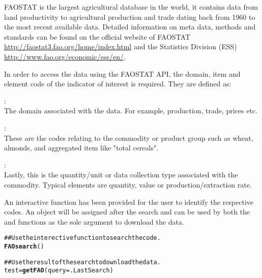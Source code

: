 \documentclass[nojss]{jss}\usepackage{graphicx, color}
\makeatletter
\newcommand{\hlfunctioncall}[1]{\textcolor[rgb]{0.501960784313725,0,0.329411764705882}{\textbf{#1}}}%
\newcommand{\hlcomment}[1]{\textcolor[rgb]{0.180392156862745,0.6,0.341176470588235}{#1}}%
\newenvironment{kframe}{%
 \def\at@end@of@kframe{}%
 \ifinner\ifhmode%
  \def\at@end@of@kframe{\end{minipage}}%
  \begin{minipage}{\columnwidth}%
 \fi\fi%
 \def\FrameCommand##1{\hskip\@totalleftmargin \hskip-\fboxsep
 \colorbox{shadecolor}{##1}\hskip-\fboxsep
     \hskip-\linewidth \hskip-\@totalleftmargin \hskip\columnwidth}%
 \MakeFramed {\advance\hsize-\width
   \@totalleftmargin\z@ \linewidth\hsize
   \@setminipage}}%
 {\par\unskip\endMakeFramed%
 \at@end@of@kframe}
\newenvironment{knitrout}{}{} %
\makeatother
\begin{document}
FAOSTAT is the largest agricultural database in the world, it contains
data from land productivity to agricultural production and trade
dating back from 1960 to the most recent available data. Detailed
information on meta data, methods and standards can be found on the
official website of FAOSTAT
\url{http://faostat3.fao.org/home/index.html} and the Statistics
Division (ESS) \url{http://www.fao.org/economic/ess/en/}.

In order to access the data using the FAOSTAT API, the domain, item
and element code of the indicator of interest is required. They are
defined as:

\begin{itemize}
  {\setlength\itemindent{48pt}\item[Domain Code]: \hfill\\ The domain
    associated with the data. For example, production, trade, prices
    etc.}  {\setlength\itemindent{30pt}\item[Item Code]: \hfill\\
    These are the codes relating to the commodity or product group
    such as wheat, almonds, and aggregated item like "total cereals".}
  {\setlength\itemindent{49pt}\item[Element Code]: \hfill\\Lastly,
    this is the quantity/unit or data collection type associated with
    the commodity. Typical elements are quantity, value or
    production/extraction rate.}
\end{itemize}

An interactive function  has been provided for the
user to identify the respective codes. An object 
will be assigned after the search and can be used by both the
 and  functions as the sole argument to
download the data.

\begin{knitrout}
\color{fgcolor}\begin{kframe}
\begin{alltt}
\hlcomment{## Use the interective function to search the code.}
\hlfunctioncall{FAOsearch}()

\hlcomment{## Use the result of the search to download the data.}
test = \hlfunctioncall{getFAO}(query = .LastSearch)
\end{alltt}
\end{kframe}
\end{knitrout}
\end{document}
